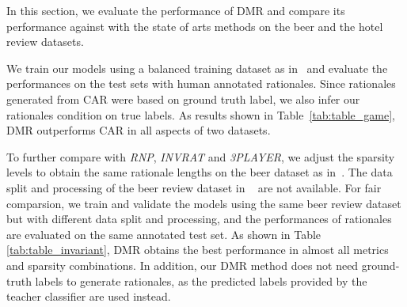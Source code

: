 \documentclass[letterpaper]{article} %
\begin{document}

In this section, we evaluate the performance of DMR and compare its performance against with the state of arts methods on the beer and the hotel review datasets. 

 
We train our models using a balanced training dataset as in~\cite{chang2019game} and evaluate the performances on the test sets with human annotated rationales.
Since  rationales generated from CAR were based on ground truth label,  we also infer our rationales condition on true labels. As results shown in Table~\ref{tab:table_game}, DMR outperforms CAR in all aspects of two datasets.

To further compare with \emph{RNP}, \emph{INVRAT} and \emph{3PLAYER},  we adjust the sparsity levels to obtain the same rationale lengths on the beer dataset as in~\cite{chang2020invariant}. The data split and processing of the beer review dataset in ~\cite{chang2020invariant} are not available. 
For  fair comparsion,  we train and validate the models using the same beer review dataset but with different data split and processing, and the performances of rationales are evaluated on the same annotated test set.
As shown in Table \ref{tab:table_invariant}, DMR obtains the best performance in almost all metrics and sparsity combinations. 
In addition, our DMR method does not need ground-truth labels to generate rationales, as the predicted labels provided by the teacher classifier are used instead.
\end{document}
